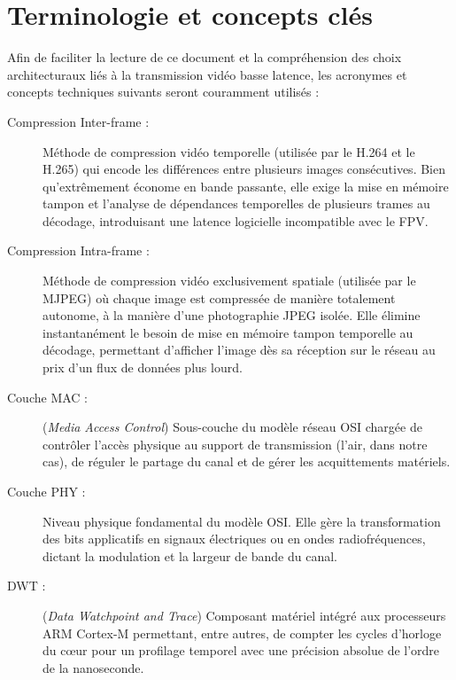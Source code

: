 \section{Terminologie et concepts clés}

Afin de faciliter la lecture de ce document et la compréhension des choix architecturaux liés à la transmission 
vidéo basse latence, les acronymes et concepts techniques suivants seront couramment utilisés :

\begin{description}
    \item[Compression Inter-frame :] Méthode de compression vidéo temporelle (utilisée par le H.264 et le H.265) 
    qui encode les différences entre plusieurs images consécutives. Bien qu'extrêmement économe en bande passante, 
    elle exige la mise en mémoire tampon et l'analyse de dépendances temporelles de plusieurs trames au décodage, 
    introduisant une latence logicielle incompatible avec le FPV.
    
    \item[Compression Intra-frame :] Méthode de compression vidéo exclusivement spatiale (utilisée par le MJPEG) 
    où chaque image est compressée de manière totalement autonome, à la manière d'une photographie JPEG isolée. 
    Elle élimine instantanément le besoin de mise en mémoire tampon temporelle au décodage, permettant d'afficher 
    l'image dès sa réception sur le réseau au prix d'un flux de données plus lourd.

    \item[Couche MAC :] (\textit{Media Access Control}) Sous-couche du modèle réseau OSI chargée de contrôler 
    l'accès physique au support de transmission (l'air, dans notre cas), de réguler le partage du canal et de 
    gérer les acquittements matériels.
    
    \item[Couche PHY :] Niveau physique fondamental du modèle OSI. Elle gère la transformation des bits 
    applicatifs en signaux électriques ou en ondes radiofréquences, dictant la modulation et la largeur 
    de bande du canal.
    
    \item[DWT :] (\textit{Data Watchpoint and Trace}) Composant matériel intégré aux processeurs ARM Cortex-M 
    permettant, entre autres, de compter les cycles d'horloge du cœur pour un profilage temporel avec une précision 
    absolue de l'ordre de la nanoseconde.
    

\end{description}
